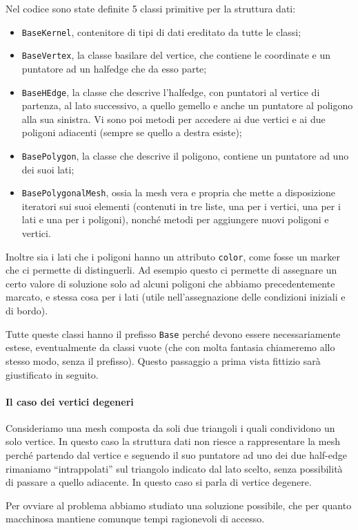 Nel codice sono state definite 5 classi primitive per la struttura dati:
\begin{itemize}
\item \texttt{BaseKernel}, contenitore di tipi di dati ereditato da tutte le classi;
\item \texttt{BaseVertex}, la classe basilare del vertice, che contiene le coordinate e un puntatore ad un halfedge che da esso parte;
\item \texttt{BaseHEdge}, la classe che descrive l'halfedge, con puntatori al vertice di partenza, al lato successivo, a quello gemello e anche un puntatore al poligono alla sua sinistra. Vi sono poi metodi per accedere ai due vertici e ai due poligoni adiacenti (sempre se quello a destra esiste);
\item \texttt{BasePolygon}, la classe che descrive il poligono, contiene un puntatore ad uno dei suoi lati;
\item \texttt{BasePolygonalMesh}, ossia la mesh vera e propria che mette a disposizione iteratori sui suoi elementi (contenuti in tre liste, una per i vertici, una per i lati e una per i poligoni), nonché metodi per aggiungere nuovi poligoni e vertici.
\end{itemize}
Inoltre sia i lati che i poligoni hanno un attributo \texttt{color}, come fosse un marker che ci permette di distinguerli. Ad esempio questo ci permette di assegnare un certo valore di soluzione solo ad alcuni poligoni che abbiamo precedentemente marcato, e stessa cosa per i lati (utile nell'assegnazione delle condizioni iniziali e di bordo).
 
Tutte queste classi hanno il prefisso \texttt{Base} perché devono essere necessariamente estese, eventualmente da classi vuote (che con molta fantasia chiameremo allo stesso modo, senza il prefisso). Questo passaggio a prima vista fittizio sarà giustificato in seguito.
\paragraph{Il caso dei vertici degeneri}
Consideriamo una mesh composta da soli due triangoli i quali condividono un solo vertice. In questo caso la struttura dati non riesce a rappresentare la mesh perché partendo dal vertice e seguendo il suo puntatore ad uno dei due half-edge rimaniamo ``intrappolati'' sul triangolo indicato dal lato scelto, senza possibilità di passare a quello adiacente. In questo caso si parla di vertice degenere.

Per ovviare al problema abbiamo studiato una soluzione possibile, che per quanto macchinosa mantiene comunque tempi ragionevoli di accesso. 

